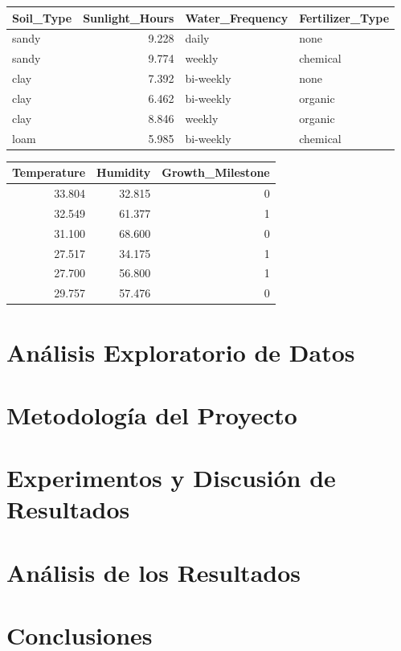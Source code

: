 \documentclass[12pt,a4paper]{article}
\begin{document}
{        \begin{center}    
            \begin{tabular}{lrll}
                \toprule
                Soil\_Type & Sunlight\_Hours & Water\_Frequency & Fertilizer\_Type \\
                \midrule
                sandy & 9.228 & daily     & none     \\
                sandy & 9.774 & weekly    & chemical \\
                clay  & 7.392 & bi-weekly & none     \\
                clay  & 6.462 & bi-weekly & organic  \\
                clay  & 8.846 & weekly    & organic  \\
                loam  & 5.985 & bi-weekly & chemical \\
                \bottomrule
            \end{tabular}
            \begin{tabular}{rrr}
                \toprule
                Temperature & Humidity & Growth\_Milestone \\
                \midrule
                33.804 & 32.815 & 0 \\
                32.549 & 61.377 & 1 \\
                31.100 & 68.600 & 0 \\
                27.517 & 34.175 & 1 \\
                27.700 & 56.800 & 1 \\
                29.757 & 57.476 & 0 \\
                \bottomrule
            \end{tabular}
        \end{center}

    }
    \newpage

    \section{Análisis Exploratorio de Datos}
    {}
    \newpage

    \section{Metodología del Proyecto}
    {}
    \newpage

    \section{Experimentos y Discusión de Resultados}
    {}
    \newpage

    \section{Análisis de los Resultados}
    {}
    \newpage

    \section{Conclusiones}
    {}
    \newpage

    \printbibliography[heading=bibintoc,title={Referencias Bibliográficas}]
\end{document}
